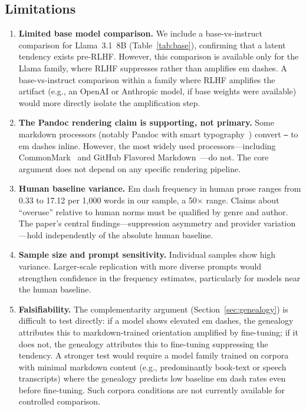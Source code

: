 \subsection{Limitations}

\begin{enumerate}[leftmargin=*]
\item \textbf{Limited base model comparison.} We include a base-vs-instruct comparison for Llama~3.1~8B (Table~\ref{tab:base}), confirming that a latent tendency exists pre-RLHF. However, this comparison is available only for the Llama family, where RLHF suppresses rather than amplifies em dashes. A base-vs-instruct comparison within a family where RLHF amplifies the artifact (e.g., an OpenAI or Anthropic model, if base weights were available) would more directly isolate the amplification step.

\item \textbf{The Pandoc rendering claim is supporting, not primary.} Some markdown processors (notably Pandoc with smart typography~\cite{pandoc2024}) convert \texttt{---} to em dashes inline. However, the most widely used processors---including CommonMark~\cite{commonmark2021} and GitHub Flavored Markdown~\cite{gfm2024}---do not. The core argument does not depend on any specific rendering pipeline.

\item \textbf{Human baseline variance.} Em dash frequency in human prose ranges from 0.33 to 17.12 per 1,000 words in our sample, a 50$\times$ range. Claims about ``overuse'' relative to human norms must be qualified by genre and author. The paper's central findings---suppression asymmetry and provider variation---hold independently of the absolute human baseline.

\item \textbf{Sample size and prompt sensitivity.} Individual samples show high variance. Larger-scale replication with more diverse prompts would strengthen confidence in the frequency estimates, particularly for models near the human baseline.

\item \textbf{Falsifiability.} The complementarity argument (Section~\ref{sec:genealogy}) is difficult to test directly: if a model shows elevated em dashes, the genealogy attributes this to markdown-trained orientation amplified by fine-tuning; if it does not, the genealogy attributes this to fine-tuning suppressing the tendency. A stronger test would require a model family trained on corpora with minimal markdown content (e.g., predominantly book-text or speech transcripts) where the genealogy predicts low baseline em dash rates even before fine-tuning. Such corpora conditions are not currently available for controlled comparison.
\end{enumerate}
